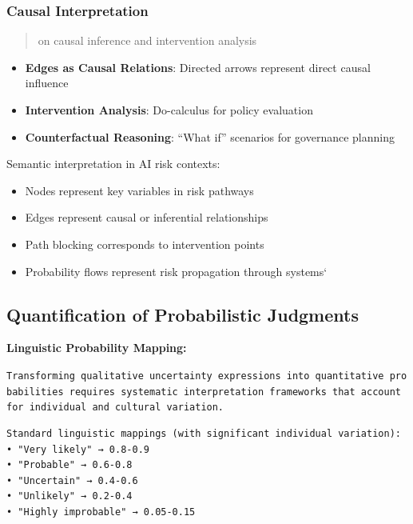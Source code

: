\documentclass[
  11pt,
  letterpaper,
]{book}
\providecommand{\tightlist}{%
  \setlength{\itemsep}{0pt}\setlength{\parskip}{0pt}}
\begin{document}
\subsubsection{Causal Interpretation}\label{sec-causal-interpretation}

\begin{quote}
\textcite{pearl2009} on causal inference and intervention analysis
\end{quote}

\begin{itemize}
\tightlist
\item
  \textbf{Edges as Causal Relations}: Directed arrows represent direct
  causal influence
\item
  \textbf{Intervention Analysis}: Do-calculus for policy evaluation
\item
  \textbf{Counterfactual Reasoning}: ``What if'' scenarios for
  governance planning
\end{itemize}

Semantic interpretation in AI risk contexts:

\begin{itemize}
\tightlist
\item
  Nodes represent key variables in risk pathways
\item
  Edges represent causal or inferential relationships
\item
  Path blocking corresponds to intervention points
\item
  Probability flows represent risk propagation through systems`
\end{itemize}

\subsection{Quantification of Probabilistic
Judgments}\label{sec-quantification}

\textbf{Linguistic Probability Mapping:}

\texttt{Transforming\ qualitative\ uncertainty\ expressions\ into\ quantitative\ probabilities\ requires\ systematic\ interpretation\ frameworks\ that\ account\ for\ individual\ and\ cultural\ variation.}

\begin{verbatim}
Standard linguistic mappings (with significant individual variation):
• "Very likely" → 0.8-0.9
• "Probable" → 0.6-0.8  
• "Uncertain" → 0.4-0.6
• "Unlikely" → 0.2-0.4
• "Highly improbable" → 0.05-0.15
\end{verbatim}
\end{document}
